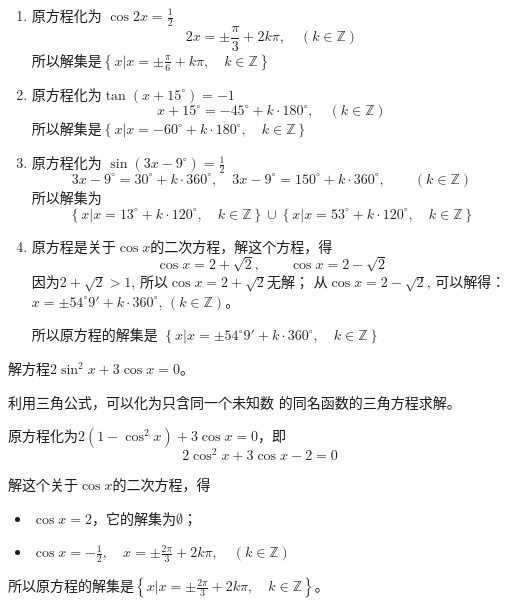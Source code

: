 \begin{solution}
 \begin{enumerate}
     \item 原方程化为 $\cos 2x=\frac{1}{2}$
\[2x=\pm\frac{\pi}{3}+2k\pi,\quad (k\in\mathbb{Z})\] 
所以解集是$\left\{x\Big|x=\pm\frac{\pi}{6}+k\pi,\quad k\in\mathbb{Z}\right\}$
\item  原方程化为$\tan(x+15^{\circ})=-1$
\[x+15^{\circ}=-45^{\circ}+k\cdot 180^{\circ},\quad (k\in\mathbb{Z})\]
所以解集是$\left\{x\Big|x=-60^{\circ}+k\cdot 180^{\circ},\quad k\in\mathbb{Z}\right\}$
\item 原方程化为 $\sin(3x-9^{\circ})=\frac{1}{2}$
\[3x-9^{\circ}=30^{\circ}+k\cdot 360^{\circ},\quad 3x-9^{\circ}=150^{\circ}+k\cdot 360^{\circ},\qquad (k\in\mathbb{Z})\]
所以解集为$$\left\{x\Big|x=13^{\circ}+k\cdot 120^{\circ},\quad k\in\mathbb{Z}\right\}\cup \left\{x\Big|x=53^{\circ}+k\cdot 120^{\circ},\quad k\in\mathbb{Z}\right\}$$
\item 原方程是关于$\cos x$的二次方程，解这个方程，得
\[\cos x=2+\sqrt{2},\qquad \cos x=2-\sqrt{2}\]
因为$2+\sqrt{2}>1$, 所以$\cos x=2+\sqrt{2}$无解；
从$\cos x=2-\sqrt{2}$, 可以解得：$x=\pm 54^{\circ}9'+k\cdot 360^{\circ}$, $(k\in\mathbb{Z})$。

所以原方程的解集是
$\left\{x\Big|x=\pm 54^{\circ}9'+k\cdot 360^{\circ},\quad k\in\mathbb{Z}\right\}$
 \end{enumerate}  
\end{solution}

\begin{example}
    解方程$2\sin^2x+3\cos x=0$。
\end{example}

\begin{analyze}
    利用三角公式，可以化为只含同一个未知数
的同名函数的三角方程求解。
\end{analyze}

\begin{solution}
    原方程化为$2(1-\cos^2x)+3\cos x=0$，即
\[2\cos^2x+3\cos x-2=0\]

解这个关于$\cos x$的二次方程，得
\begin{itemize}
    \item $\cos x=2$，它的解集为$\emptyset$；
    \item $\cos x=-\frac{1}{2},\quad x=\pm\frac{2\pi}{3}+2k\pi,\quad (k\in\mathbb{Z})$
\end{itemize}
所以原方程的解集是$\left\{x\Big|x=\pm \frac{2\pi}{3}+2k\pi,\quad k\in\mathbb{Z}\right\}$。
\end{solution}

